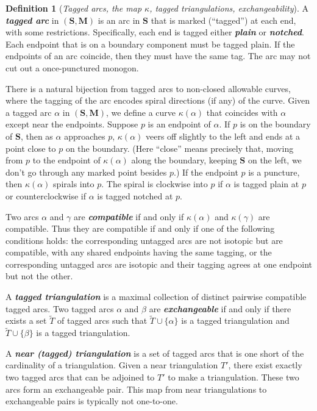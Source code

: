 \documentclass{amsart}
\theoremstyle{definition}
\newtheorem{definition}[proposition]{Definition}
\theoremstyle{remark}
\numberwithin{equation}{section}
\newcommand{\newword}[1]{\textbf{\emph{#1}}}
\newcommand{\set}[1]{{\lbrace #1 \rbrace}}
\newcommand{\0}{{\mathbf{0}}}
\newcommand{\M}{\mathbf{M}}
\renewcommand{\S}{\mathbf{S}}
\begin{document}
\begin{definition}[\emph{Tagged arcs, the map $\kappa$, tagged triangulations, exchangeability}]\label{tagged tri def}
A \newword{tagged arc} in $(\S,\M)$ is an arc in $\S$ that is marked (``tagged'') at each end, with some restrictions.
Specifically, each end is tagged either \newword{plain} or \newword{notched}.
Each endpoint that is on a boundary component must be tagged plain.
If the endpoints of an arc coincide, then they must have the same tag.
The arc may not cut out a once-punctured monogon.

There is a natural bijection from tagged arcs to non-closed allowable curves, where the tagging of the arc encodes spiral directions (if any) of the curve.
Given a tagged arc $\alpha$ in $(\S,\M)$, we define a curve $\kappa(\alpha)$ that coincides with $\alpha$ except near the endpoints.
Suppose $p$ is an endpoint of $\alpha$. 
If $p$ is on the boundary of $\S$, then as $\alpha$ approaches $p$, $\kappa(\alpha)$ veers off slightly to the left and ends at a point close to $p$ on the boundary.
(Here ``close'' means precisely that, moving from $p$ to the endpoint of $\kappa(\alpha)$ along the boundary, keeping $\S$ on the left, we don't go through any marked point besides $p$.)
If the endpoint $p$ is a puncture, then $\kappa(\alpha)$ spirals into $p$.
The spiral is clockwise into $p$ if $\alpha$ is tagged plain at $p$ or counterclockwise if $\alpha$ is tagged notched at $p$.

Two arcs $\alpha$ and $\gamma$ are \newword{compatible} if and only if $\kappa(\alpha)$ and $\kappa(\gamma)$ are compatible.
Thus they are compatible if and only if one of the following conditions holds:
the corresponding untagged arcs are not isotopic but are compatible, with any shared endpoints having the same tagging, or
the corresponding untagged arcs are isotopic and their tagging agrees at one endpoint but not the other.

A \newword{tagged triangulation} is a maximal collection of distinct pairwise compatible tagged arcs.
Two tagged arcs $\alpha$ and $\beta$ are \newword{exchangeable} if and only if there exists a set $\widetilde T$ of tagged arcs such that $\widetilde T\cup\set{\alpha}$ is a tagged triangulation and $\widetilde T\cup\set{\beta}$ is a tagged triangulation.

A \newword{near (tagged) triangulation} is a set of tagged arcs that is one short of the cardinality of a triangulation.
Given a near triangulation $T'$, there exist exactly two tagged arcs that can be adjoined to $T'$ to make a triangulation. 
These two arcs form an exchangeable pair.
This map from near triangulations to exchangeable pairs is typically not one-to-one.
\end{definition}
\end{document}
